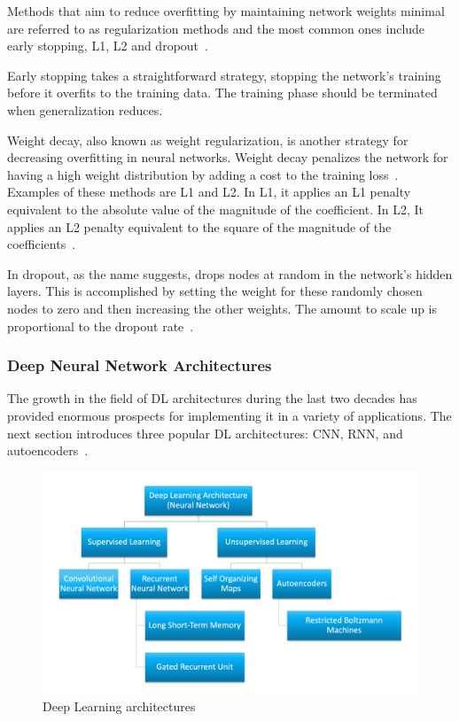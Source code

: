 Methods that aim to reduce overfitting by maintaining network weights minimal are referred to as regularization methods and the most common ones include early stopping, L1, L2 and dropout~\cite{Brownlee2019HowNetworks}.

Early stopping takes a straightforward strategy, stopping the network's training before it overfits to the training data. The training phase should be terminated when generalization reduces.

Weight decay, also known as weight regularization, is another strategy for decreasing overfitting in neural networks. Weight decay penalizes the network for having a high weight distribution by adding a cost to the training loss~\cite{Brownlee2019HowNetworks}. Examples of these methods are L1 and L2. In L1, it applies an L1 penalty equivalent to the absolute value of the magnitude of the coefficient. In L2, It applies an L2 penalty equivalent to the square of the magnitude of the coefficients~\cite{Tyagi2021L2Learning}.

In dropout, as the name suggests, drops nodes at random in the network's hidden layers. This is accomplished by setting the weight for these randomly chosen nodes to zero and then increasing the other weights. The amount to scale up is proportional to the dropout rate~\cite{Brownlee2019HowNetworks}.

\subsubsection{Deep Neural Network Architectures}

The growth in the field of \gls{DL} architectures during the last two decades has provided enormous prospects for implementing it in a variety of applications. The next section introduces three popular \gls{DL} architectures: \gls{CNN}, \gls{RNN}, and autoencoders~\cite{Ganatra2018ATools,Madhavan2021DeepDeveloper}.

\begin{figure}[htbp]
    \centering
    \includegraphics[width=\linewidth]{Chapters/Figures/DL-arch.png}
    \caption{Deep Learning architectures~\cite{Madhavan2021DeepDeveloper}}
    \label{fig:DL-arch}
\end{figure}

